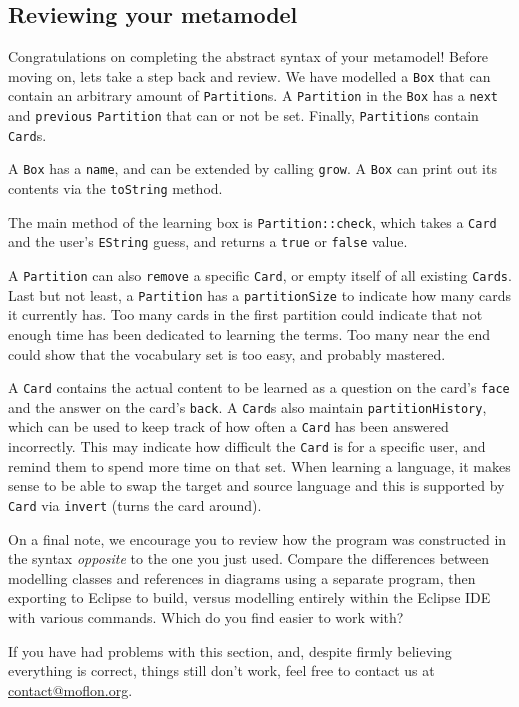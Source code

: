 \newpage 
\genHeader
\subsection{Reviewing your metamodel}
\hypertarget{static review}{}

Congratulations on completing the abstract syntax of your metamodel! Before moving on, lets take a step back and review. We have modelled a \texttt{Box} that
can contain an arbitrary amount of \texttt{Partition}s. A \texttt{Partition} in the \texttt{Box} has a \texttt{next} and \texttt{previous} \texttt{Partition}
that can or not be set. Finally, \texttt{Partition}s contain \texttt{Card}s.

A \texttt{Box} has a \texttt{name}, and can be extended by calling \texttt{grow}. A \texttt{Box} can print out its contents via the \texttt{toString} method.

The main method of the learning box is \texttt{Partition::check}, which takes a \texttt{Card} and the user's \texttt{EString} guess, and returns a \texttt{true}
or \texttt{false} value.

A \texttt{Partition} can also \texttt{remove} a specific \texttt{Card}, or empty itself of all  existing \texttt{Cards}. Last but not least, a
\texttt{Partition} has a \texttt{partitionSize} to indicate how many cards it currently has. Too many cards in the first partition could indicate that not
enough time has been dedicated to learning the terms. Too many near the end could show that the vocabulary set is too easy, and probably mastered.

A \texttt{Card} contains the actual content to be learned as a question on the card's \texttt{face} and the answer on the card's \texttt{back}. A \texttt{Card}s
also maintain \texttt{partition\-History}, which can be used to keep track of how often a \texttt{Card} has been answered incorrectly.
This may indicate how difficult the \texttt{Card} is for a specific user, and remind them to spend more time on that set. When learning a language, it makes
sense to be able to swap the target and source language and this is supported by \texttt{Card} via \texttt{invert} (turns the card around).

On a final note, we encourage you to review how the program was constructed in the syntax \emph{opposite} to the one you just used. Compare the differences
between modelling classes and references in diagrams using a separate program, then exporting to Eclipse to build, versus modelling entirely within the Eclipse
IDE with various commands. Which do you find easier to work with?

If you have had problems with this section, and, despite firmly believing everything is correct, things still don't work, feel free to contact us at 
\href{mailto:contact@moflon.org}{contact@moflon.org}.

